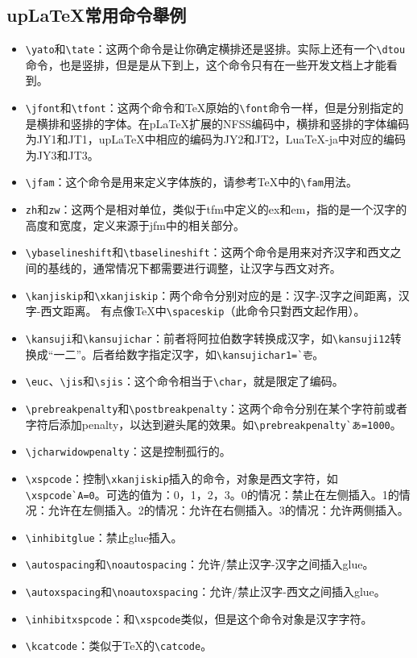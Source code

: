 \begin{appendix}
\section{up{\LaTeX}常用命令舉例}
\symtr
\begin{itemize}
\item{}{\verb+\yato+}和{\verb+\tate+}：这两个命令是让你确定横排还是竖排。实际上还有一个{\verb+\dtou+}命令，也是竖排，但是是从下到上，这个命令只有在一些开发文档上才能看到。
\item{}{\verb+\jfont+}和{\verb+\tfont+}：这两个命令和TeX原始的{\verb+\font+}命令一样，但是分别指定的是横排和竖排的字体。在{p\LaTeX}扩展的NFSS编码中，横排和竖排的字体编码为JY1和JT1，{up\LaTeX}中相应的编码为JY2和JT2，{Lua\TeX}-ja中对应的编码为JY3和JT3。
\item{}{\verb+\jfam+}：这个命令是用来定义字体族的，请参考{\TeX}中的{\verb+\fam+}用法。
\item{}{\verb+zh+}和{\verb+zw+}：这两个是相对单位，类似于tfm中定义的ex和em，指的是一个汉字的高度和宽度，定义来源于jfm中的相关部分。
\item{}{\verb+\ybaselineshift+}和{\verb+\tbaselineshift+}：这两个命令是用来对齐汉字和西文之间的基线的，通常情况下都需要进行调整，让汉字与西文对齐。
\item{}{\verb+\kanjiskip+}和{\verb+\xkanjiskip+}：两个命令分别对应的是：汉字-汉字之间距离，汉字-西文距离。 有点像{\TeX}中{\verb+\spaceskip+}（此命令只對西文起作用）。
\item{}{\verb+\kansuji+}和{\verb+\kansujichar+}：前者将阿拉伯数字转换成汉字，如{\verb+\kansuji12+}转换成“一二”。后者给数字指定汉字，如{\verb+\kansujichar1=`壱+}。
\item{}{\verb+\euc+}、{\verb+\jis+}和{\verb+\sjis+}：这个命令相当于{\verb+\char+}，就是限定了编码。
\item{}{\verb+\prebreakpenalty+}和{\verb+\postbreakpenalty+}：这两个命令分别在某个字符前或者字符后添加penalty，以达到避头尾的效果。如{\verb+\prebreakpenalty`あ=1000+}。
\item{}{\verb+\jcharwidowpenalty+}：这是控制孤行的。
\item{}{\verb+\xspcode+}：控制{\verb+\xkanjiskip+}插入的命令，对象是西文字符，如{\verb+\xspcode`A=0+}。可选的值为：0，1，2，3。0的情况：禁止在左侧插入。1的情况：允许在左侧插入。2的情况：允许在右侧插入。3的情况：允许两侧插入。
\item{}{\verb+\inhibitglue+}：禁止glue插入。
\item{}{\verb+\autospacing+}和{\verb+\noautospacing+}：允许/禁止汉字-汉字之间插入glue。
\item{}{\verb+\autoxspacing+}和{\verb+\noautoxspacing+}：允许/禁止汉字-西文之间插入glue。
\item{}{\verb+\inhibitxspcode+}：和{\verb+\xspcode+}类似，但是这个命令对象是汉字字符。
\item{}{\verb+\kcatcode+}：类似于TeX的{\verb+\catcode+}。
\end{itemize}


\end{appendix}
